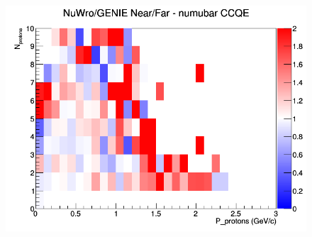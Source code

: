\documentclass[12pt]{article}
\begin{document}
\begin{figure}[h]
\endminipage
{}
\includegraphics[width=\linewidth]{N_P/nominal/protons/ratios/CCQE_NuWro_GENIE_numubar_NF_N_P.png}
\endminipage
\newline
\end{figure}
\clearpage
\end{document}
